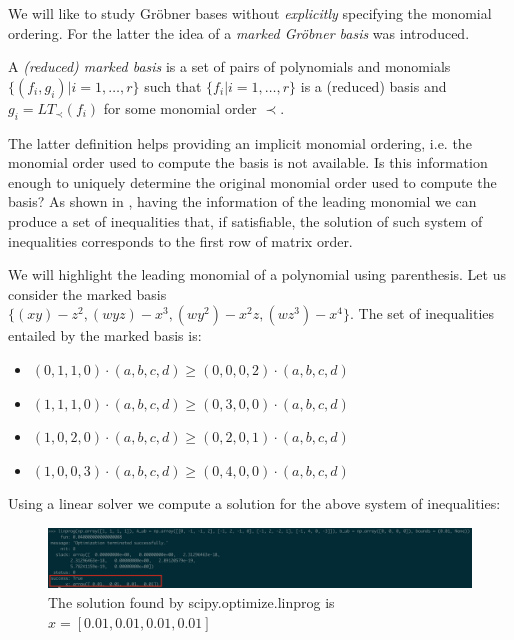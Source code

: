 We will like to study Gr\"obner bases without \emph{explicitly}
specifying the monomial ordering. For the latter the idea of a
\emph{marked Gr\"obner basis} was introduced.

\begin{definition} \cite{Cox:2014}
  A \emph{(reduced) marked \grob basis} is a set of pairs of polynomials and monomials
  $\{(f_i, g_i) | i = 1, \dots, r\}$ such that $\{f_i | i = 1, \dots, r\}$ is
  a (reduced) \grob basis and $g_i = LT_\prec(f_i)$ for some monomial order $\prec$.
\end{definition}

The latter definition helps providing an implicit monomial ordering,
i.e. the monomial order used to compute the \grob basis is not available.
Is this information enough to uniquely determine the original
monomial order used to compute the \grob basis? As shown in \cite{Cox:2014},
having the information of the leading monomial we can produce a set of
inequalities that, if satisfiable, the solution of such system of inequalities
corresponds to the first row of matrix order.

\begin{example} We will highlight the leading monomial of a polynomial using parenthesis.
  Let us consider the marked \grob basis $\{(xy)-z^2, (wyz)-x^3, (wy^2)-x^2z, (wz^3)-x^4\}$.
  The set of inequalities entailed by the marked \grob basis is:
  \begin{itemize}
  \item $(0, 1, 1, 0) \cdot (a, b, c, d) \geq (0, 0, 0, 2) \cdot (a, b, c, d)$
  \item $(1, 1, 1, 0) \cdot (a, b, c, d) \geq (0, 3, 0, 0) \cdot (a, b, c, d)$
  \item $(1, 0, 2, 0) \cdot (a, b, c, d) \geq (0, 2, 0, 1) \cdot (a, b, c, d)$
  \item $(1, 0, 0, 3) \cdot (a, b, c, d) \geq (0, 4, 0, 0) \cdot (a, b, c, d)$
  \end{itemize}
  Using a linear solver we compute a solution for the above system of inequalities:

  \begin{figure}[h]
    \centering
    \includegraphics[width=15cm]{example1}
    \caption{The solution found by scipy.optimize.linprog \cite{linprog} is $x = [0.01, 0.01, 0.01, 0.01]$}
  \end{figure}
\end{example}

